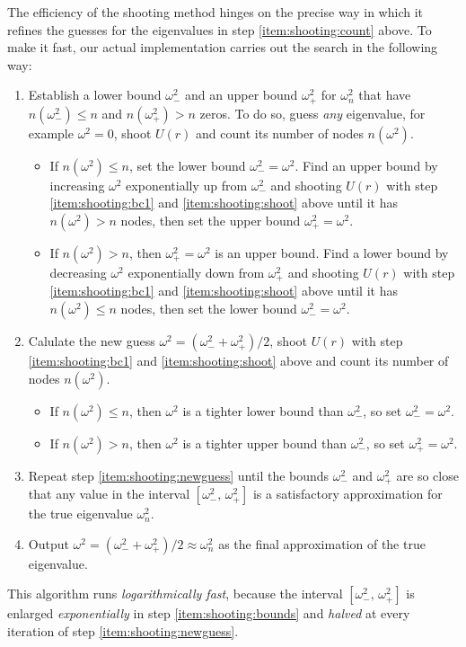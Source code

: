 The efficiency of the shooting method hinges on the precise way in which it refines the guesses for the eigenvalues in step \ref{item:shooting:count} above.
To make it fast, our actual implementation carries out the search in the following way:
\begin{enumerate}
\item Establish a lower bound $\omega_-^2$ and an upper bound $\omega_+^2$ for $\omega_n^2$ that have $n(\omega_-^2) \leq n$ and $n(\omega_+^2) > n$ zeros.
      To do so, guess \emph{any} eigenvalue, for example $\omega^2 = 0$, shoot $U(r)$ and count its number of nodes $n(\omega^2)$.
      \begin{itemize}
      \item If $n(\omega^2) \leq n$, set the lower bound $\omega_-^2 = \omega^2$.
            Find an upper bound by increasing $\omega^2$ exponentially up from $\omega_-^2$ and shooting $U(r)$ with step \ref{item:shooting:bc1} and \ref{item:shooting:shoot} above until it has $n(\omega^2) > n$ nodes, then set the upper bound $\omega_+^2 = \omega^2$.
      \item If $n(\omega^2) >    n$, then $\omega_+^2 = \omega^2$ is an upper bound.
            Find a lower bound by decreasing $\omega^2$ exponentially down from $\omega_+^2$ and shooting $U(r)$ with step \ref{item:shooting:bc1} and \ref{item:shooting:shoot} above until it has $n(\omega^2) \leq n$ nodes, then set the lower bound $\omega_-^2 = \omega^2$.
      \end{itemize}
      \label{item:shooting:bounds}
\item Calulate the new guess $\omega^2 = (\omega_-^2 + \omega_+^2) / 2$, shoot $U(r)$ with step \ref{item:shooting:bc1} and \ref{item:shooting:shoot} above and count its number of nodes $n(\omega^2)$. \label{item:shooting:newguess}
      \begin{itemize}
      \item If $n(\omega^2) \leq n$, then $\omega^2$ is a tighter lower bound than $\omega_-^2$, so set $\omega_-^2 = \omega^2$.
      \item If $n(\omega^2) >    n$, then $\omega^2$ is a tighter upper bound than $\omega_-^2$, so set $\omega_+^2 = \omega^2$.
      \end{itemize}
\item Repeat step \ref{item:shooting:newguess} until the bounds $\omega_-^2$ and $\omega_+^2$ are so close that any value in the interval $[\omega_-^2, \, \omega_+^2]$ is a satisfactory approximation for the true eigenvalue $\omega_n^2$.
\item Output $\omega^2 = (\omega_-^2 + \omega_+^2) / 2 \approx \omega_n^2$ as the final approximation of the true eigenvalue.
\end{enumerate}
This algorithm runs \emph{logarithmically fast}, because the interval $[\omega_-^2, \, \omega_+^2]$ is enlarged \emph{exponentially} in step \ref{item:shooting:bounds} and \emph{halved} at every iteration of step \ref{item:shooting:newguess}.

